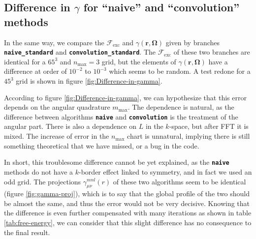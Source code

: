 \subsection{Difference in $\gamma$ for ``naive'' and ``convolution'' methods}

In the same way, we compare the $\mathcal{F}_{\mathrm{exc}}$ and
$\gamma(\mathbf{r},\mathbf{\Omega})$ given by branches \texttt{\textbf{naive\_standard}}
and \texttt{\textbf{convolution\_standard}}. The $\mathcal{F}_{\mathrm{exc}}$
of these two branches are identical for a $65^{3}$ and $n_{\max}=3$
grid, but the elements of $\gamma(\mathbf{r},\mathbf{\Omega})$ have
a difference at order of $10^{-2}$ to $10^{-3}$ which seems to be
random. A test redone for a $45^{3}$ grid is shown in figure \ref{fig:Difference-in-gamma}.

According to figure \ref{fig:Difference-in-gamma}, we can hypothesize
that this error depends on the angular quadrature $m_{\max}$. The
dependence is natural, as the difference between algorithms \texttt{\textbf{naive}}
and \texttt{\textbf{convolution}} is the treatment of the angular
part. There is also a dependence on $L$ in the $k$-space, but after
\acs{FFT} it is mixed. The increase of error in the $n_{\max}$ chart
is unnatural, implying there is still something theoretical that we
have missed, or a bug in the code.

In short, this troublesome difference cannot be yet explained, as
the \texttt{\textbf{naive}} methods do not have a $k$-border effect
linked to symmetry, and in fact we used an odd grid. The projections
$\gamma_{\mu\nu}^{mnl}(r)$ of these two algorithms seem to be identical
(figure \ref{fig:gamma-proj}), which is to say that the global profile
of the two should be almost the same, and thus the error would not
be very decisive. Knowing that the difference is even further compensated
with many iterations as shown in table \ref{tab:free-energy}, we
can consider that this slight difference has no consequence to the
final result.

